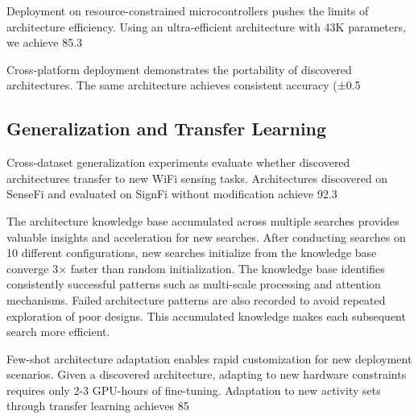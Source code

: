 \documentclass[journal]{IEEEtran}
\begin{document}
Deployment on resource-constrained microcontrollers pushes the limits of architecture efficiency. Using an ultra-efficient architecture with 43K parameters, we achieve 85.3%

Cross-platform deployment demonstrates the portability of discovered architectures. The same architecture achieves consistent accuracy (±0.5%

\subsection{Generalization and Transfer Learning}

Cross-dataset generalization experiments evaluate whether discovered architectures transfer to new WiFi sensing tasks. Architectures discovered on SenseFi and evaluated on SignFi without modification achieve 92.3%

The architecture knowledge base accumulated across multiple searches provides valuable insights and acceleration for new searches. After conducting searches on 10 different configurations, new searches initialize from the knowledge base converge 3× faster than random initialization. The knowledge base identifies consistently successful patterns such as multi-scale processing and attention mechanisms. Failed architecture patterns are also recorded to avoid repeated exploration of poor designs. This accumulated knowledge makes each subsequent search more efficient.

Few-shot architecture adaptation enables rapid customization for new deployment scenarios. Given a discovered architecture, adapting to new hardware constraints requires only 2-3 GPU-hours of fine-tuning. Adaptation to new activity sets through transfer learning achieves 85%
\end{document}
